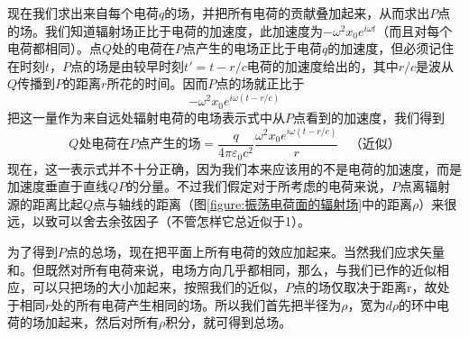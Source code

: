 现在我们求出来自每个电荷$q$的场，并把所有电荷的贡献叠加起来，从而求出$P$点的场。我们知道辐射场正比于电荷的加速度，此加速度为$-\omega^2x_0e^{i\omega t}$（而且对每个电荷都相同）。点$Q$处的电荷在$P$点产生的电场正比于电荷$q$的加速度，但必须记住在时刻$t$，$P$点的场是由较早时刻$t'=t-r/c$电荷的加速度给出的，其中$r/c$是波从$Q$传播到$P$的距离$r$所花的时间。因而$P$点的场就正比于
\begin{equation}
    \label{Eq:I:30:10}
    -\omega^2x_0e^{i\omega(t-r/c)}
\end{equation}
把这一量作为来自远处辐射电荷的电场表示式中从$P$点看到的加速度，我们得到
\begin{equation}
    \label{Eq:I:30:11}
    \text{$Q$处电荷在$P$点产生的场}=\frac{q}{4\pi\varepsilon_0c^2}\frac{\omega^2x_0e^{i\omega(t-r/c)}}{r} ~~~~\text{（近似）}
\end{equation}
现在，这一表示式并不十分正确，因为我们本来应该用的不是电荷的加速度，而是加速度垂直于直线$QP$的分量。不过我们假定对于所考虑的电荷来说，$P$点离辐射源的距离比起$Q$点与轴线的距离（图\ref{figure:振荡电荷面的辐射场}中的距离$\rho$）来很远，以致可以舍去余弦因子（不管怎样它总近似于1）。

为了得到$P$点的总场，现在把平面上所有电荷的效应加起来。当然我们应求矢量和。但既然对所有电荷来说，电场方向几乎都相同，那么，与我们已作的近似相应，可以只把场的大小加起来，按照我们的近似，$P$点的场仅取决于距离r，故处于相同$r$处的所有电荷产生相同的场。所以我们首先把半径为$\rho$，宽为$d\rho$的环中电荷的场加起来，然后对所有$\rho$积分，就可得到总场。

